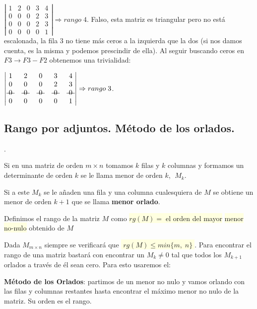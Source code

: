 \begin{ejem}

$\left| \begin{matrix}  1&2&0&3&4\\0&0&0&2&3\\0&0&0&2&3\\0&0&0&0&1 \end{matrix} \right| \Rightarrow rango \; 4$. Falso, esta matriz es triangular pero no está escalonada, la fila $3$ no tiene más ceros a la izquierda que la dos (si nos damos cuenta, es la misma y podemos prescindir de ella). Al seguir buscando ceros en $F3\to F3-F2$ obtenemos una trivialidad:

$\left| \begin{matrix}  1&2&0&3&4\\0&0&0&2&3\\ \text{\textst{ 0 }}&\text{\textst{ 0 }}&\text{\textst{ 0 }}&\text{\textst{ 0 }}&\text{\textst{ 0 }}  \\0&0&0&0&1 \end{matrix} \right| \Rightarrow rango \; 3$.

	
\end{ejem}


\subsection{Rango por adjuntos. Método de los orlados.}

\begin{defi}.

Si en una matriz de orden $m \times n$ tomamos $k$ filas y $k$ columnas y formamos  un determinante de orden $k$ se le llama menor de orden $k$, $\; M_k$.

Si a este $M_k$ se le añaden una fila y una columna cualesquiera de $M$ se obtiene un menor de orden $k+1$  que se llama \textbf{menor orlado}.

Definimos el rango de la matriz $M$ como   \colorbox{LightYellow}{$rg(M)=\; $el orden del mayor}  \colorbox{LightYellow}{ menor no-nulo} obtenido de $M$

Dada $M_{m \times n}$ siempre se verificará que  \colorbox{LightYellow}{$\boxed{ \; rg(M) \le min\{ m,\; n \} \; }$}. Para encontrar el rango de una matriz bastará con encontrar un $M_k \neq 0$ tal que todos los $M_{k+1}$ orlados a través de él sean cero. Para esto usaremos el:

\end{defi}

\textbf{Método de los Orlados}: partimos de un menor no nulo y vamos orlando con las filas y columnas restantes hasta encontrar el máximo menor no nulo de la matriz. Su orden es el rango. 

